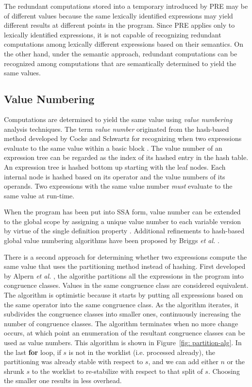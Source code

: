The redundant computations stored into a temporary introduced by PRE may
be of different values because the same lexically identified expressions may
yield different results at different points in the program.
Since PRE applies only to lexically identified expressions, it is not capable
of recognizing redundant computations among lexically different expressions
based on their semantics.  On the other hand, under the semantic approach, 
redundant computations can be recognized among computations that are 
semantically determined to yield the same values.

\subsection{Value Numbering}

Computations are determined to yield the same value using \emph{value numbering}
analysis techniques.  The term \emph{value number} originated from the 
hash-based method developed by Cocke and Schwartz for recognizing when two
expressions evaluate to the same value within a basic block \cite{CS70}.  
The value number of an expression tree can be regarded as the index of its
hashed entry in the hash table.  
An expression tree is hashed bottom up starting with the leaf nodes.  
Each internal node is hashed based on its operator and the value numbers of 
its operands.  Two expressions with the same
value number \emph{must} evaluate to the same value at run-time.

When the program has been put into SSA form, value number can be extended to the
global scope by assigning a unique value number to each variable version by
virtue of the single definition property \cite{Rosen88}.  Additional 
refinements to hash-based global value numbering algorithms have been proposed
by Briggs {\it et al.} \cite{Briggs97}.

There is a second approach for determining whether two expressions compute the
same value that uses the partitioning method instead of hashing. 
First developed by
Alpern {\it et al.} \cite{AWZ88}, the algorithe partitions all the expressions
in the program into congruence classes.  Values in the same congruence class 
are considered equivalent.  The algorithm is optimistic because it
starts by putting all expressions based on the same operator into the same
congruence class.  As the algorithm iterates, it subdivides the congruence
classes into smaller ones, continuously increasing the number of congruence
classes.  The algorithm terminates when no more change occurs,
at which point an enumeration of the resultant congruence classes can be
used as value numbers.  This algorithm is shown in 
Figure~\ref{fig: partition-alg}. In the last {\bf for} loop, if $s$ is not in
the worklist (i.e. processed already), the partitioning was already stable 
with respect to $s$, and
we can add either $n$ or the shrunk $s$ to the worklist to re-stabilize with
respect to that split of $s$.  Choosing the smaller one results in less
overhead.

